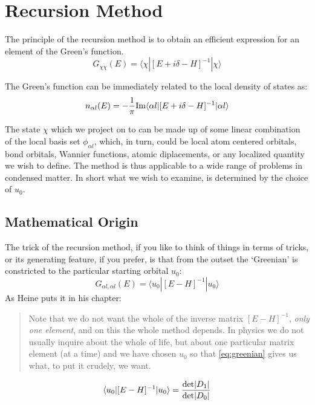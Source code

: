 \documentclass{article}
\def\ket{\rangle}
\def\bra{\langle}
\begin{document}
\section{Recursion Method}
  The principle of the recursion method is to obtain an efficient expression 
for an element of the Green's function.
%
\begin{equation}
G_{\chi\chi}(E) = \bra\chi|[E + i\delta -H]^{-1}|\chi\ket
\end{equation}
%

The Green's function can be immediately related to the local density of states as:
%
\begin{equation}
n_{\alpha l}(E) = -\frac{1}{\pi} {\rm Im}\bra\alpha l|[E + i\delta -H]^{-1}|\alpha l\ket
\end{equation}
%

The state $\chi$ which we project on to can be made up of some linear combination 
of the local basis set $\phi_{\alpha l}$, which, in turn, could be local atom centered orbitals, bond orbitals, 
Wannier functions, atomic diplacements, or any localized quantity we wish to define. The method is thus
applicable to a wide range of problems in condensed matter. In short what we wish to examine, 
is determined by the choice of $u_{0}$.

\subsection{Mathematical Origin}
The trick of the recursion method, if you like to think of things in terms of tricks, 
or its generating feature, if you prefer, is that from the outset the `Greenian' is constricted
to the particular starting orbital $u_{0}$: 
%
\begin{equation}
G_{\alpha l, \alpha l}(E) = \bra u_{0}|[E-H]^{-1}|u_{0}\ket 
\end{equation}
%
As Heine puts it in his chapter:
%
\begin{quote}
Note that we do not want the whole of the inverse matrix $[E-H]^{-1}$, 
\emph{only one element}, and on this the whole method depends. In physics we do not
usually inquire about the whole of life, but about one particular matrix element (at a time) and we have chosen
$u_{0}$ so that \ref{eq:greenian} gives us what, to put it crudely, we want.
\end{quote}

%
\begin{equation}
\bra u_{0}|[E-H]^{-1}|u_{0}\ket = \frac{{\rm det}|D_{1}|}{{\rm det}|D_{0}|}
\end{equation}
%
\end{document}
